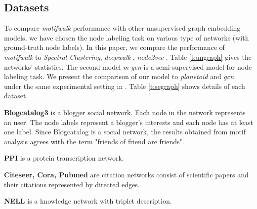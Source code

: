 \documentclass{article}
\theoremstyle{definition}
\begin{document}
\subsection{Datasets}

To compare \emph{motifwalk} performance with other unsupervised graph
embedding models, we have chosen the node labeling task on various
type of networks (with ground-truth node labels). In this paper, we
compare the performance of \emph{motifwalk} to 
\emph{Spectral Clustering}, 
\emph{deepwalk} \cite{deepwalk}, \emph{node2vec} \cite{node2vec}. Table \ref{t:ungraph}
gives the networks' statistics. The second model \emph{m-gcn} is a semi-supervised model for node
labeling task. We present the comparison of our model to \emph{planetoid} and
\emph{gcn} under the same experimental setting in \cite{gcn}. Table \ref{t:segraph}
shows details of each dataset.

\textbf{Blogcatalog3} \cite{blogcatalog} is a blogger social network. Each node
in the network represents an user. The node labels represent a blogger's interests and
each node has at least one label. Since Blogcatalog is a social network, the results
obtained from motif analysis agrees with the term "friends of friend are friends".

\textbf{PPI} \cite{PPI} is a protein transcription network.

\textbf{Citeseer, Cora, Pubmed} \cite{citeseer,cora,pubmed} are citation networks 
consist of scientific papers and their citations represented by directed edges.

\textbf{NELL} \cite{NELL} is a knowledge network with triplet description.

\begin{table}[H]
\centering
{}
\caption{Datasets for unsupervised embeddings}
\label{t:ungraph}
\end{table}
\end{document}
